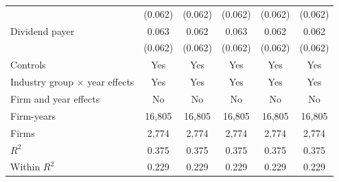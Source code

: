 \begin{tabular}{lccccc}
 & (0.062) & (0.062) & (0.062) & (0.062) & (0.062) \\
Dividend payer & 0.063 & 0.062 & 0.063 & 0.062 & 0.062 \\
 & (0.062) & (0.062) & (0.062) & (0.062) & (0.062) \\
\midrule
Controls & Yes & Yes & Yes & Yes & Yes \\
Industry group $\times$ year effects & Yes & Yes & Yes & Yes & Yes \\
Firm and year effects & No & No & No & No & No \\
Firm-years & 16,805 & 16,805 & 16,805 & 16,805 & 16,805 \\
Firms & 2,774 & 2,774 & 2,774 & 2,774 & 2,774 \\
$R^2$ & 0.375 & 0.375 & 0.375 & 0.375 & 0.375 \\
Within $R^2$ & 0.229 & 0.229 & 0.229 & 0.229 & 0.229 \\
\bottomrule
\end{tabular}
